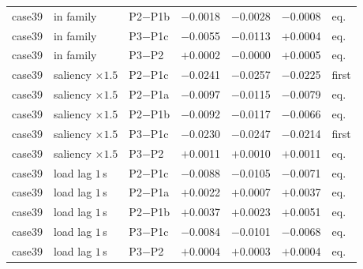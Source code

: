 \begin{table}[H]
\begin{tabular}{lllcccl}
case39 & in family & P2$-$P1b & $-$0.0018 & $-$0.0028 & $-$0.0008 & eq.\\
case39 & in family & P3$-$P1c & $-$0.0055 & $-$0.0113 & $+$0.0004 & eq.\\
case39 & in family & P3$-$P2 & $+$0.0002 & $-$0.0000 & $+$0.0005 & eq.\\
case39 & saliency $\times1.5$ & P2$-$P1c & $-$0.0241 & $-$0.0257 & $-$0.0225 & first\\
case39 & saliency $\times1.5$ & P2$-$P1a & $-$0.0097 & $-$0.0115 & $-$0.0079 & eq.\\
case39 & saliency $\times1.5$ & P2$-$P1b & $-$0.0092 & $-$0.0117 & $-$0.0066 & eq.\\
case39 & saliency $\times1.5$ & P3$-$P1c & $-$0.0230 & $-$0.0247 & $-$0.0214 & first\\
case39 & saliency $\times1.5$ & P3$-$P2 & $+$0.0011 & $+$0.0010 & $+$0.0011 & eq.\\
case39 & load lag $1$\,s & P2$-$P1c & $-$0.0088 & $-$0.0105 & $-$0.0071 & eq.\\
case39 & load lag $1$\,s & P2$-$P1a & $+$0.0022 & $+$0.0007 & $+$0.0037 & eq.\\
case39 & load lag $1$\,s & P2$-$P1b & $+$0.0037 & $+$0.0023 & $+$0.0051 & eq.\\
case39 & load lag $1$\,s & P3$-$P1c & $-$0.0084 & $-$0.0101 & $-$0.0068 & eq.\\
case39 & load lag $1$\,s & P3$-$P2 & $+$0.0004 & $+$0.0003 & $+$0.0004 & eq.\\
\bottomrule
\end{tabular}
\end{table}

